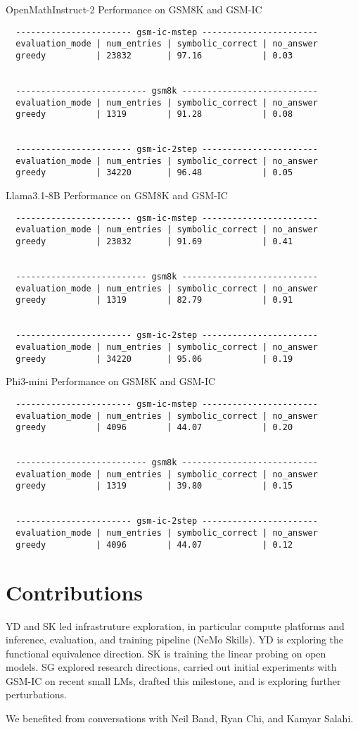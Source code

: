 \documentclass{article}
\begin{document}
OpenMathInstruct-2 Performance on GSM8K and GSM-IC
\begin{verbatim}
  ----------------------- gsm-ic-mstep -----------------------
  evaluation_mode | num_entries | symbolic_correct | no_answer
  greedy          | 23832       | 97.16            | 0.03     


  -------------------------- gsm8k ---------------------------
  evaluation_mode | num_entries | symbolic_correct | no_answer
  greedy          | 1319        | 91.28            | 0.08     


  ----------------------- gsm-ic-2step -----------------------
  evaluation_mode | num_entries | symbolic_correct | no_answer
  greedy          | 34220       | 96.48            | 0.05  \end{verbatim}

Llama3.1-8B Performance on GSM8K and GSM-IC
\begin{verbatim}
  ----------------------- gsm-ic-mstep -----------------------
  evaluation_mode | num_entries | symbolic_correct | no_answer
  greedy          | 23832       | 91.69            | 0.41     


  -------------------------- gsm8k ---------------------------
  evaluation_mode | num_entries | symbolic_correct | no_answer
  greedy          | 1319        | 82.79            | 0.91     


  ----------------------- gsm-ic-2step -----------------------
  evaluation_mode | num_entries | symbolic_correct | no_answer
  greedy          | 34220       | 95.06            | 0.19  \end{verbatim}

Phi3-mini Performance on GSM8K and GSM-IC
\begin{verbatim}
  ----------------------- gsm-ic-mstep -----------------------
  evaluation_mode | num_entries | symbolic_correct | no_answer
  greedy          | 4096        | 44.07            | 0.20     
  
  
  -------------------------- gsm8k ---------------------------
  evaluation_mode | num_entries | symbolic_correct | no_answer
  greedy          | 1319        | 39.80            | 0.15     
  
  
  ----------------------- gsm-ic-2step -----------------------
  evaluation_mode | num_entries | symbolic_correct | no_answer
  greedy          | 4096        | 44.07            | 0.12   \end{verbatim}


\section{Contributions}
YD and SK led infrastruture exploration, in particular compute platforms and inference, evaluation, and training pipeline (NeMo Skills). YD is exploring the functional equivalence direction. SK is training the linear probing on open models. SG explored research directions, carried out initial experiments with GSM-IC on recent small LMs, drafted this milestone, and is exploring further perturbations.

We benefited from conversations with Neil Band, Ryan Chi, and Kamyar Salahi.



\end{document}
